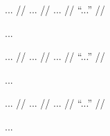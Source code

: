 \documentclass[12pt,paper=a4]{scrartcl}
\begin{document}
\ex \begingl
	\glpreamble ... //
	\gla ... //
	\glb ... //
	\glft \enquote{...} //
\endgl \xe

...


\ex \begingl
	\glpreamble ... //
	\gla ... //
	\glb ... //
	\glft \enquote{...} //
\endgl \xe

...


\ex \begingl
	\glpreamble ... //
	\gla ... //
	\glb ... //
	\glft \enquote{...} //
\endgl \xe

...


\printbibliography
\end{document}
